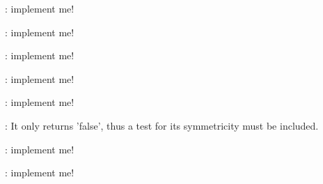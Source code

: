 \begin{DoxyRefList}
\item[\label{todo__todo000028}%
\hypertarget{todo__todo000028}{}%
Member \hyperlink{class_q_u_e_s_o_1_1_gaussian_vector_r_v_a2c7bee2104f7e257ca31d185634c2910}{Q\-U\-E\-S\-O\-:\-:Gaussian\-Vector\-R\-V$<$ V, M $>$\-:\-:print} (std\-::ostream \&os) const ]\-: implement me!  
\item[\label{todo__todo000029}%
\hypertarget{todo__todo000029}{}%
Member \hyperlink{class_q_u_e_s_o_1_1_generic_vector_cdf_a475687f4b66245980a79fcc825c76c7c}{Q\-U\-E\-S\-O\-:\-:Generic\-Vector\-Cdf$<$ V, M $>$\-:\-:print} (std\-::ostream \&os) const ]\-: implement me!  
\item[\label{todo__todo000030}%
\hypertarget{todo__todo000030}{}%
Member \hyperlink{class_q_u_e_s_o_1_1_generic_vector_mdf_a69bc51a5e118670a573c5378ea1e634f}{Q\-U\-E\-S\-O\-:\-:Generic\-Vector\-Mdf$<$ V, M $>$\-:\-:print} (std\-::ostream \&os) const ]\-: implement me!  
\item[\label{todo__todo000031}%
\hypertarget{todo__todo000031}{}%
Member \hyperlink{class_q_u_e_s_o_1_1_generic_vector_r_v_a423908e3d0aec9a48122b17ebb0a5b57}{Q\-U\-E\-S\-O\-:\-:Generic\-Vector\-R\-V$<$ V, M $>$\-:\-:print} (std\-::ostream \&os) const ]\-: implement me!  
\item[\label{todo__todo000033}%
\hypertarget{todo__todo000033}{}%
Member \hyperlink{class_q_u_e_s_o_1_1_hessian_cov_matrices_t_k_group_aa780d91ffdf133df50d5d9a3a0edaa95}{Q\-U\-E\-S\-O\-:\-:Hessian\-Cov\-Matrices\-T\-K\-Group$<$ V, M $>$\-:\-:print} (std\-::ostream \&os) const ]\-: implement me!  
\item[\label{todo__todo000032}%
\hypertarget{todo__todo000032}{}%
Member \hyperlink{class_q_u_e_s_o_1_1_hessian_cov_matrices_t_k_group_abf0f6a04543c18b2f95e615b09191c2b}{Q\-U\-E\-S\-O\-:\-:Hessian\-Cov\-Matrices\-T\-K\-Group$<$ V, M $>$\-:\-:symmetric} () const ]\-: It only returns 'false', thus a test for its symmetricity must be included.  
\item[\label{todo__todo000034}%
\hypertarget{todo__todo000034}{}%
Member \hyperlink{class_q_u_e_s_o_1_1_inverse_gamma_joint_pdf_a08dbbb7054026fcf4d429870cbe5d36f}{Q\-U\-E\-S\-O\-:\-:Inverse\-Gamma\-Joint\-Pdf$<$ V, M $>$\-:\-:ln\-Value} (const V \&domain\-Vector, const V $\ast$domain\-Direction, V $\ast$grad\-Vector, M $\ast$hessian\-Matrix, V $\ast$hessian\-Effect) const ]\-: implement me!  
\item[\label{todo__todo000035}%
\hypertarget{todo__todo000035}{}%
Member \hyperlink{class_q_u_e_s_o_1_1_inverse_gamma_vector_r_v_a7c3326d0b39a69f1edd64219f286c7e7}{Q\-U\-E\-S\-O\-:\-:Inverse\-Gamma\-Vector\-R\-V$<$ V, M $>$\-:\-:print} (std\-::ostream \&os) const ]\-: implement me!  

\end{DoxyRefList}
